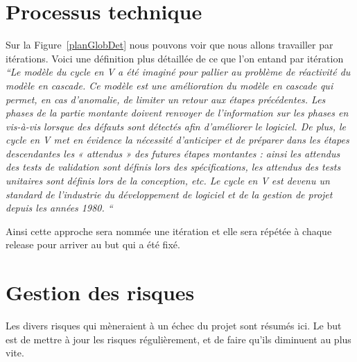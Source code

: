 \section{Processus technique}
Sur la Figure~\ref{planGlobDet} nous pouvons voir que nous allons travailler par itérations. Voici une définition plus détaillée de ce que l'on entand par itération 
\textit{``Le modèle du cycle en V a été imaginé pour pallier au problème de réactivité du modèle en cascade. Ce modèle est une amélioration du modèle en cascade qui permet, en cas d'anomalie, de limiter un retour aux étapes précédentes. Les phases de la partie montante doivent renvoyer de l'information sur les phases en vis-à-vis lorsque des défauts sont détectés afin d'améliorer le logiciel.
De plus, le cycle en V met en évidence la nécessité d'anticiper et de préparer dans les étapes descendantes les « attendus » des futures étapes montantes : ainsi les attendus des tests de validation sont définis lors des spécifications, les attendus des tests unitaires sont définis lors de la conception, etc.
Le cycle en V est devenu un standard de l'industrie du développement de logiciel et de la gestion de projet depuis les années 1980. ``}\cite{wikiV}

Ainsi cette approche sera nommée une itération et elle sera répétée à chaque release pour arriver au but qui a été fixé.
\section{Gestion des risques}
Les divers risques qui mèneraient à un échec du projet sont résumés ici. Le but est de mettre à jour les risques régulièrement, et de faire qu'ils diminuent au plus vite. 
